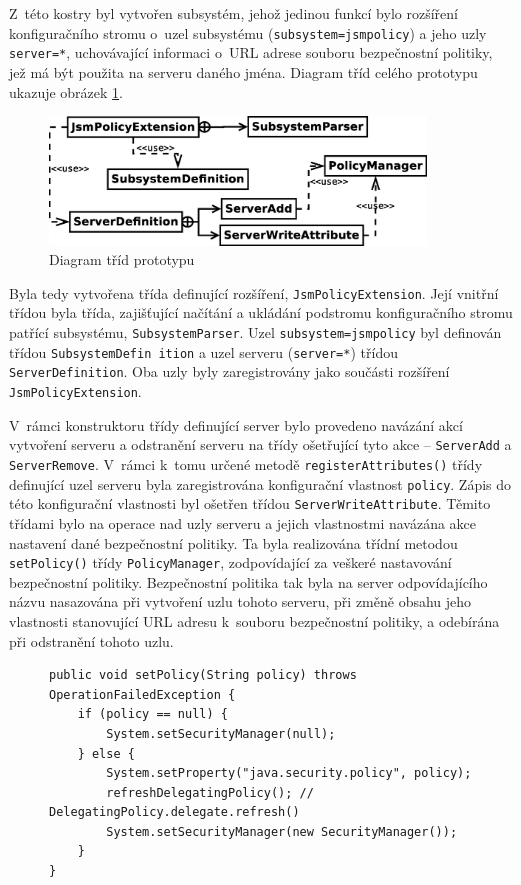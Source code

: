 Z~této kostry byl vytvořen subsystém, jehož jedinou funkcí bylo rozšíření konfiguračního stromu o~uzel subsystému ({\tt subsystem=jsmpolicy}) a jeho uzly {\tt server=*}, uchovávající informaci o~URL adrese souboru bezpečnostní politiky, jež má být použita na serveru daného jména. Diagram tříd celého prototypu ukazuje obrázek \ref{tridy1}.

\begin{figure}[ht]
  \centering
  \includegraphics[width=10cm]{fig/tridy1}
  \caption{Diagram tříd prototypu}
  \label{tridy1}
\end{figure}

Byla tedy vytvořena třída definující rozšíření, {\tt JsmPolicyExtension}.
Její vnitřní třídou byla třída, zajišťující načítání a ukládání podstromu konfiguračního stromu patřící subsystému, {\tt SubsystemParser}.
Uzel {\tt subsystem=jsmpolicy} byl definován třídou {\tt SubsystemDefin ition} a uzel serveru ({\tt server=*}) třídou {\tt ServerDefinition}.
Oba uzly byly zaregistrovány jako součásti rozšíření {\tt JsmPolicyExtension}.

V~rámci konstruktoru třídy definující server bylo provedeno navázání akcí vytvoření serveru a odstranění serveru na třídy ošetřující tyto akce -- {\tt ServerAdd} a {\tt ServerRemove}.
V~rámci k~tomu určené metodě {\tt registerAttributes()} třídy definující uzel serveru byla zaregistrována konfigurační vlastnost {\tt policy}.
Zápis do této konfigurační vlastnosti byl ošetřen třídou {\tt ServerWriteAttribute}.
Těmito třídami bylo na operace nad uzly serveru a jejich vlastnostmi navázána akce nastavení dané bezpečnostní politiky.
Ta byla realizována třídní metodou {\tt setPolicy()} třídy {\tt PolicyManager}, zodpovídající za veškeré nastavování bezpečnostní politiky.
Bezpečnostní politika tak byla na server odpovídajícího názvu nasazována při vytvoření uzlu tohoto serveru, při změně obsahu jeho vlastnosti stanovující URL adresu k~souboru bezpečnostní politiky, a odebírána při odstranění tohoto uzlu.

\begin{figure}[tbh]
\begin{lstlisting}[caption=Metoda {\tt PolicyManager.setPolicy()} zajišťující nasazení souboru bezpečnostní politiky, label=setPolicyMethod]
public void setPolicy(String policy) throws OperationFailedException {
    if (policy == null) {
        System.setSecurityManager(null);
    } else {
        System.setProperty("java.security.policy", policy);
        refreshDelegatingPolicy(); // DelegatingPolicy.delegate.refresh()
        System.setSecurityManager(new SecurityManager());
    }
}
\end{lstlisting}
\end{figure}

